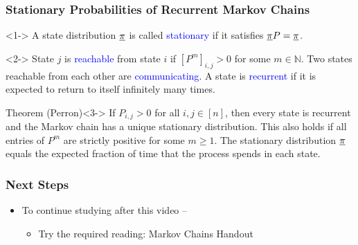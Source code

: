 \documentclass[10pt,english,aspectratio=169,handout]{beamer}
\begin{document}
\begin{frame} \frametitle{Stationary Probabilities of Recurrent Markov Chains}

\begin{definition}<1->
A state distribution $\underline{\pi}$ is called \textcolor{blue}{stationary} if it satisfies $\underline{\pi}P=\underline{\pi}$.
\end{definition}

\begin{definition}<2->
State $j$ is \textcolor{blue}{reachable} from state $i$ if $[P^m]_{i,j} >0$ for some $m\in \mathbb{N}$.
Two states reachable from each other are \textcolor{blue}{communicating}.
A state is \textcolor{blue}{recurrent} if it is expected to return to itself infinitely many times.

\end{definition}

\begin{exampleblock}{Theorem (Perron)}<3->
If $P_{i,j}>0$ for all $i,j\in[n]$, then every state is recurrent and the Markov chain has a unique stationary distribution. This also holds if all entries of $P^m$ are strictly positive for some $m\geq 1$. The stationary distribution $\underline{\pi}$ equals the expected fraction of time that the process spends in each state.
\end{exampleblock}



\end{frame}


\begin{frame} \frametitle{Next Steps}

\begin{itemize}
\setlength\itemsep{5mm}
\item To continue studying after this video -- \vspace{2mm}

\begin{itemize}
 \setlength\itemsep{3mm}
 \item Try the required reading: Markov Chains Handout
\end{itemize}
\end{itemize}


\end{frame}
\end{document}
